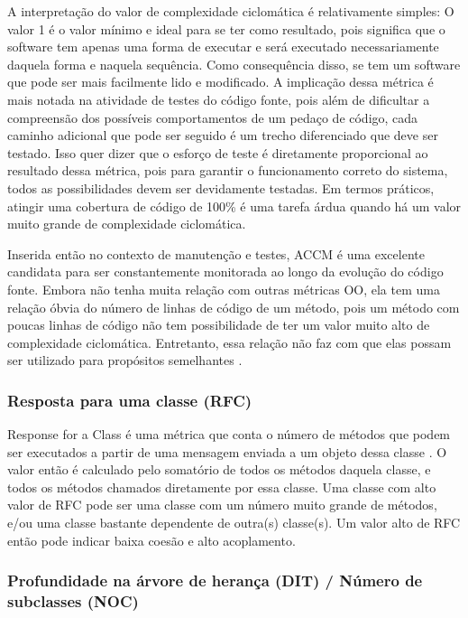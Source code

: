 A interpretação do valor de complexidade ciclomática é relativamente simples: O valor 1 é o valor mínimo e ideal para se ter como resultado, pois significa que o software tem apenas uma forma de executar e será executado necessariamente daquela forma e naquela sequência. Como consequência disso, se tem um software que pode ser mais facilmente lido e modificado. A implicação dessa métrica é mais notada na atividade de testes do código fonte, pois além de dificultar a compreensão dos possíveis comportamentos de um pedaço de código, cada caminho adicional que pode ser seguido é um trecho diferenciado que deve ser testado. Isso quer dizer que o esforço de teste é diretamente proporcional ao resultado dessa métrica, pois para garantir o funcionamento correto do sistema, todos as possibilidades devem ser devidamente testadas. Em termos práticos, atingir uma cobertura de código de 100\% é uma tarefa árdua quando há um valor muito grande de complexidade ciclomática.

Inserida então no contexto de manutenção e testes, ACCM é uma excelente candidata para ser constantemente monitorada ao longo da evolução do código fonte. Embora não tenha muita relação com outras métricas OO, ela tem uma relação óbvia do número de linhas de código de um método, pois um método com poucas linhas de código não tem possibilidade de ter um valor muito alto de complexidade ciclomática. Entretanto, essa relação não faz com que elas possam ser utilizado para propósitos semelhantes \cite{watson1996structured}.

\subsubsection{Resposta para uma classe (RFC)}

Response for a Class é uma métrica que conta o número de métodos que podem ser executados a partir de uma mensagem enviada a um objeto dessa classe \cite{chidamberkemerer}. O valor então é calculado pelo somatório de todos os métodos daquela classe, e todos os métodos chamados diretamente por essa classe. Uma classe com alto valor de RFC pode ser uma classe com um número muito grande de métodos, e/ou uma classe bastante dependente de outra(s) classe(s). Um valor alto de RFC então pode indicar baixa coesão e alto acoplamento. 

\subsubsection{Profundidade na árvore de herança (DIT) / Número de subclasses (NOC)}

